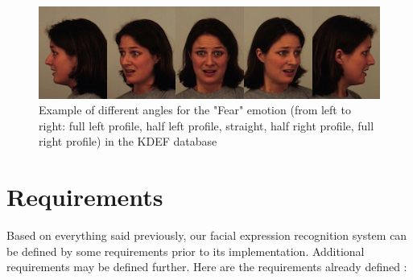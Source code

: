 \begin{figure}[!h]
\begin{center}
\noindent \includegraphics[scale=0.8]{figures/kdef_example_angle} 
\newline
\caption{Example of different angles for the "Fear" emotion (from left to right: full left profile, half left profile, straight, half right profile, full right profile) in the KDEF database}
\label{kdef_example_angle}
\end{center} 
\end{figure}

\section{Requirements}

\vspace{\baselineskip}
\noindent Based on everything said previously, our facial expression recognition system can be defined by some requirements prior to its implementation. Additional requirements may be defined further. Here are the requirements already defined :
\newline

